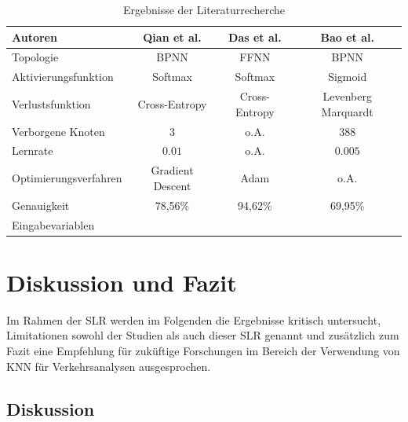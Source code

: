 \documentclass{scrartcl}
\begin{document}
\begin{table}[h!]
   \centering
   \caption{Ergebnisse der Literaturrecherche}
   \label{tab1}
   \begin{tabular}{lccc} \toprule
      Autoren               & Qian et al. \cite{qian} & Das et al.  \cite{das} & Bao et al. \cite{bao} \\ \midrule
      Topologie             & BPNN                    & FFNN                   & BPNN                  \\
      Aktivierungsfunktion  & Softmax                 & Softmax                & Sigmoid               \\
      Verlustsfunktion      & Cross-Entropy           & Cross-Entropy          & Levenberg Marquardt   \\
      Verborgene Knoten     & $3$                     & o.A.                   & $388$                 \\
      Lernrate              & $0.01$                  & o.A.                   & $0.005$               \\
      Optimierungsverfahren & Gradient Descent        & Adam                   & o.A.                  \\
      Genauigkeit           & 78,56\%                 & 94,62\%                & 69,95\%               \\
      Eingabevariablen      &                         &                        &                       \\ \bottomrule
   \end{tabular}
\end{table}

\section{Diskussion und Fazit}

Im Rahmen der SLR werden im Folgenden die Ergebnisse kritisch untersucht,
Limitationen sowohl der Studien als auch dieser SLR genannt und zusätzlich
zum Fazit eine Empfehlung für zuküftige Forschungen im Bereich der Verwendung
von KNN für Verkehrsanalysen ausgesprochen.

\subsection{Diskussion}
\end{document}
